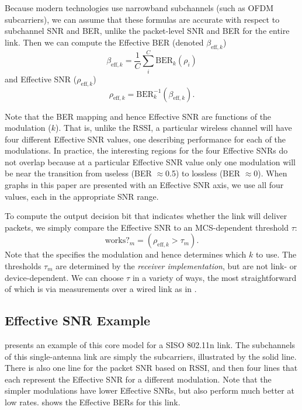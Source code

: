 Because modern technologies use narrowband subchannels (such as OFDM subcarriers), we can assume that these formulas are accurate with respect to subchannel SNR and BER, unlike the packet-level SNR and BER for the entire link. Then we can compute the Effective BER (denoted $\beta_{\text{eff},k}$)
\begin{equation}
	\label{eq:effective_ber}
	\beta_{\text{eff},k} = \frac{1}{C} \sum_{i}^{C} \text{BER}_k(\rho_i)
\end{equation}
and Effective SNR ($\rho_{\text{eff},k}$)
\begin{equation}
	\label{eq:effective_snr}
	\rho_{\text{eff},k} = \text{BER}_k^{-1}(\beta_{\text{eff},k}).
\end{equation}

Note that the BER mapping and hence Effective SNR are functions of the modulation ($k$). That is, unlike the RSSI, a particular wireless channel will have four different Effective SNR values, one describing performance for each of the modulations. In practice, the interesting regions for the four Effective SNRs do not overlap because at a particular Effective SNR value only one modulation will be near the transition from useless (BER $\approx$0.5) to lossless (BER $\approx$0). When graphs in this paper are presented with an Effective SNR axis, we use all four values, each in the appropriate SNR range.

To compute the output decision bit that indicates whether the link will deliver packets, we simply compare the Effective SNR to an MCS-dependent threshold $\tau$:
\begin{equation}
\text{works?}_m = (\rho_{\text{eff},k} > \tau_m).
\end{equation}
Note that the  specifies the modulation and hence determines which $k$ to use. The thresholds $\tau_m$ are determined by the \emph{receiver implementation}, but are not link- or device-dependent. We can choose $\tau$ in a variety of ways, the most straightforward of which is via measurements over a wired link as in .

\subsection{Effective SNR Example}
 presents an example of this core model for a SISO 802.11n link. The subchannels of this single-antenna link are simply the subcarriers, illustrated by the solid line. There is also one line for the packet SNR based on RSSI, and then four lines that each represent the Effective SNR for a different modulation. Note that the simpler modulations have lower Effective SNRs, but also perform much better at low rates.  shows the Effective BERs for this link.

